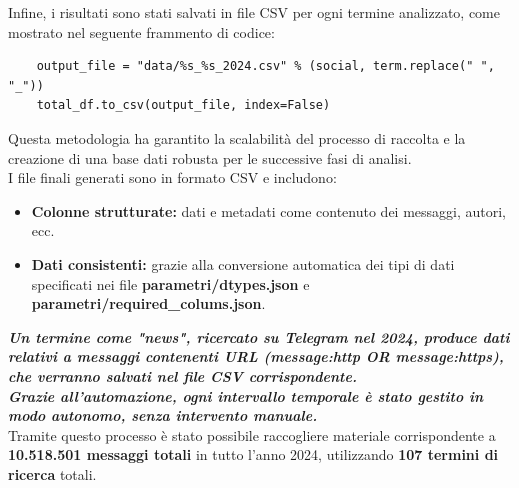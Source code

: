 \documentclass[12pt]{article}
\begin{document}
	Infine, i risultati sono stati salvati in file CSV per ogni termine analizzato, come mostrato nel seguente frammento di codice:
	\begin{lstlisting}
	output_file = "data/%s_%s_2024.csv" % (social, term.replace(" ", "_"))
	total_df.to_csv(output_file, index=False)
	\end{lstlisting}
	Questa metodologia ha garantito la scalabilità del processo di raccolta e la creazione di una base dati robusta per le successive fasi di analisi.\\
	I file finali generati sono in formato CSV e includono:
	\begin{itemize}[label=]
		\item \textbf{Colonne strutturate:} dati e metadati come contenuto dei messaggi, autori, ecc.
		\item \textbf{Dati consistenti:} grazie alla conversione automatica dei tipi di dati specificati nei file \textbf{parametri/dtypes.json} e \textbf{parametri/required\_colums.json}.
	\end{itemize}
	\textbf{\textit{Un termine come "news", ricercato su Telegram nel 2024, produce dati relativi a messaggi contenenti URL (message:http OR message:https), che verranno salvati nel file CSV corrispondente.\\
	Grazie all'automazione, ogni intervallo temporale è stato gestito in modo autonomo, senza intervento manuale.}}\\
	Tramite questo processo è stato possibile raccogliere materiale corrispondente a \textbf{10.518.501 messaggi totali} in tutto l'anno 2024, utilizzando \textbf{107 termini di ricerca} totali.
\end{document}
